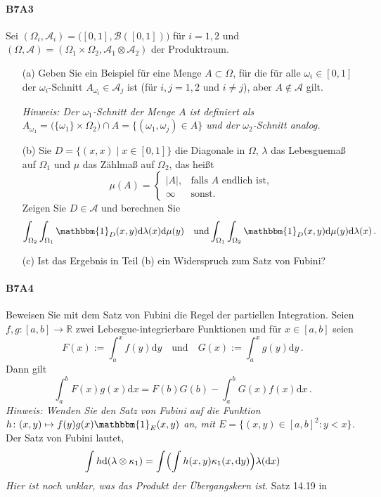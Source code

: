 \documentclass{article}
\begin{document}
\paragraph{B7A3}
Sei $(\Omega_i,\mathcal{A}_i)=\bigl([0,1],\mathcal{B}([0,1])\bigr)$ für $i=1,2$ und $(\Omega,\mathcal{A})=(\Omega_1\times\Omega_2,\mathcal{A}_1\otimes\mathcal{A}_2)$ der Produktraum.
\begin{enumerate}
\item[(a)] Geben Sie ein Beispiel für eine Menge
  $A\subset\Omega$, für die für alle $\omega_i\in[0,1]$ der
  $\omega_i$-Schnitt $A_{\omega_i}\in\mathcal{A}_j$ ist (für
  $i,j=1,2$ und $i\neq j$), aber $A\notin\mathcal{A}$ gilt.

  \emph{Hinweis: Der $\omega_1$-Schnitt der Menge $A$ ist definiert als $A_{\omega_1}=\bigl(\{\omega_1\}\times\Omega_2\bigr)\cap A=\{(\omega_1,\omega_j)\in A\}$ und der $\omega_2$-Schnitt analog.}
\end{enumerate}
\begin{enumerate}
\item[(b)] Sie $D=\{(x,x)\mid x\in[0,1]\}$ die Diagonale in $\Omega$, $\lambda$ das Lebesguemaß auf $\Omega_1$ und $\mu$ das Zählmaß auf $\Omega_2$, das heißt
  \[
    \mu(A)=
    \begin{cases}
      |A|,&\text{falls $A$ endlich ist,}\\
      \infty&\text{sonst.}
    \end{cases}
  \]
  Zeigen Sie $D\in\mathcal{A}$ und berechnen Sie
  \[
    \int_{\Omega_2}\int_{\Omega_1}\mathbbm{1}_{D}(x,y)\mathrm{d}\lambda(x)\mathrm{d}\mu(y)\quad\text{und}\int_{\Omega_1}\int_{\Omega_2}\mathbbm{1}_{D}(x,y)\mathrm{d}\mu(y)\mathrm{d}\lambda(x)\,.
  \]
\item[(c)] Ist das Ergebnis in Teil (b) ein Widerspruch zum Satz von Fubini?
\end{enumerate}
\newpage

\paragraph{B7A4}
Beweisen Sie mit dem Satz von Fubini die Regel der partiellen Integration.
Seien $f,g\colon [a,b]\to\mathbb{R}$ zwei Lebesgue-integrierbare Funktionen und für $x\in[a,b]$ seien
\[
  F(x):=\int_a^xf(y)\mathrm{d}y\quad\text{und}\quad G(x):=\int_a^xg(y)\mathrm{d}y\,.
\]
Dann gilt
\[
  \int_a^bF(x)g(x)\mathrm{d}x=F(b)G(b)-\int_a^bG(x)f(x)\mathrm{d}x\,.
\]
\emph{Hinweis: Wenden Sie den Satz von Fubini auf die Funktion $h\colon (x,y)\mapsto f(y)g(x)\mathbbm{1}_E(x,y)$ an, mit $E=\{(x,y)\in[a,b]^2:y<x\}$.}
Der Satz von Fubini lautet, 
\[
  \int h\mathrm{d}(\lambda\otimes\kappa_1)=\int\Bigl(\int h(x,y)\kappa_1(x,\mathrm{d}y)\Bigr)\lambda(\mathrm{d}x)
\]
\emph{Hier ist noch unklar, was das Produkt der Übergangskern ist.}
Satz 14.19 in \cite{Klenke}
\newpage



\end{document}
